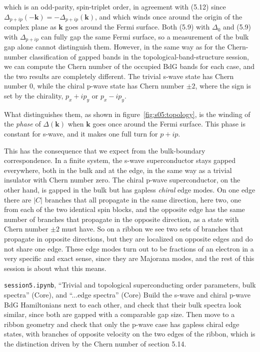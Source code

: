 which is an odd-parity, spin-triplet order, in agreement with (5.12) since $\Delta_{p+ip}(-\mathbf
k) =
-\Delta_{p+ip}(\mathbf k)$, and which winds once around the origin of the complex plane as $\mathbf
k$ goes around the Fermi surface. Both (5.9) with $\Delta_0$ and (5.9) with $\Delta_{p+ip}$ can
fully gap the same Fermi surface, so a measurement of the bulk gap alone cannot distinguish them.
However, in the same way as for the Chern-number classification of gapped bands in the
topological-band-structure session, we can compute the Chern number of the occupied BdG bands for
each case, and the two results are completely different. The trivial s-wave state has Chern number
$0$, while the chiral p-wave state has Chern number $\pm 2$, where the sign is set by the
chirality, $p_x + ip_y$ or $p_x - ip_y$.

What distinguishes them, as shown in figure~\ref{fig:s05:topology}, is the winding of the
\emph{phase} of $\Delta(\mathbf k)$ when $\mathbf k$ goes once around the Fermi surface. This phase
is constant for s-wave, and it makes one full turn for $p+ip$.

This has the consequence that we expect from the bulk-boundary correspondence. In a finite system,
the s-wave superconductor stays gapped everywhere, both in the bulk and at the edge, in the same way
as a trivial insulator with Chern number zero. The chiral p-wave superconductor, on the other hand,
is gapped in the bulk but has gapless \emph{chiral} edge modes. On one edge there are $|C|$ branches
that all propagate in the same direction, here two, one from each of the two identical spin blocks,
and the opposite edge has the same number of branches that propagate in the opposite direction, as
a state with Chern number $\pm 2$ must have. So on a ribbon we see two sets of branches that
propagate in opposite directions, but they are localized on opposite edges and do not share one
edge. These edge modes turn out to be fractions of an electron in a very specific and exact sense,
since they are Majorana modes, and the rest of this session is about what this means.



\begin{notebookbox}{\texttt{session5.ipynb}, ``Trivial and topological superconducting order parameters, bulk spectra'' (Core), and ``...edge spectra'' (Core)}
Build the s-wave and chiral p-wave BdG Hamiltonians next to each other, and check that their bulk
spectra look similar, since both are gapped with a comparable gap size. Then move to a ribbon
geometry and check that only the p-wave case has gapless chiral edge states, with branches of
opposite velocity on the two edges of the ribbon, which is the distinction driven by the Chern
number of section 5.14.
\end{notebookbox}

